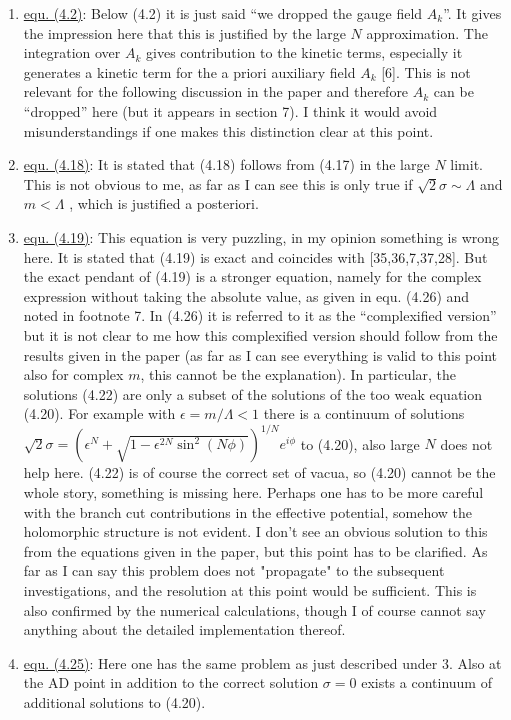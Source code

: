 \documentclass[a4paper,12pt]{article}
\begin{document}
\begin{enumerate}

\item \underline{equ. (4.2)}: Below (4.2) it is just said ``we dropped
the gauge field $A_k$''. It gives the impression here that this is
justified by the large $N$ approximation. The integration over $A_k$
gives contribution to the kinetic terms, especially it generates a
kinetic term for the a priori auxiliary field $A_k$ [6]. This is not
relevant for the following discussion in the paper and therefore $A_k$
can be ``dropped'' here (but it appears in section 7). I think it
would avoid misunderstandings if one makes this distinction clear at
this point.

\item \underline{equ. (4.18)}: It is stated that (4.18) follows from
(4.17) in the large $N$ limit. This is not obvious to me, as far as I
can see this is only true if $\sqrt{2}\sigma \sim \Lambda$ and $m <
\Lambda$ , which is justified a posteriori.

\item \underline{equ. (4.19)}: This equation is very puzzling, in my
opinion something is wrong here. It is stated that (4.19) is exact and
coincides with [35,36,7,37,28]. But the exact pendant of (4.19) is a
stronger equation, namely for the complex expression without taking
the absolute value, as given in equ. (4.26) and noted in footnote 7.
In (4.26) it is referred to it as the ``complexified version'' but it
is not clear to me how this complexified version should follow from
the results given in the paper (as far as I can see everything is
valid to this point also for complex $m$, this cannot be the
explanation). In particular, the solutions (4.22) are only a subset of
the solutions of the too weak equation (4.20). For example with
$\epsilon=m/\Lambda<1$ there is a continuum of solutions
$\sqrt{2}\sigma =
(\epsilon^N+\sqrt{1-\epsilon^{2N}\sin^2(N\phi)})^{1/N}e^{i\phi}$ to
(4.20), also large $N$ does not help here. (4.22) is of course the
correct set of vacua, so (4.20) cannot be the whole story, something
is missing here. Perhaps one has to be more careful with the branch
cut contributions in the effective potential, somehow the holomorphic
structure is not evident. I don't see an obvious solution to this from
the equations given in the paper, but this point has to be clarified.
As far as I can say this problem does not "propagate" to the
subsequent investigations, and the resolution at this point would be
sufficient. This is also confirmed by the numerical calculations,
though I of course cannot say anything about the detailed
implementation thereof.

\item \underline{equ. (4.25)}: Here one has the same problem as just
described under 3. Also at the AD point in addition to the correct
solution $\sigma =0$ exists a continuum of additional solutions to
(4.20).

\end{enumerate}
\end{document}
